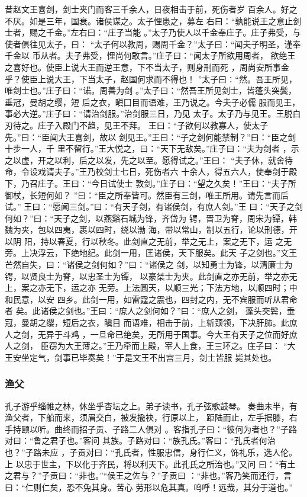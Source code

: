 \documentclass[]{article}
\begin{document}
昔赵文王喜剑，剑士夹门而客三千余人，日夜相击于前，死伤者岁
百余人。好之不厌。如是三年，国衰。诸侯谋之。太子悝患之，募左
右曰：``孰能说王之意止剑士者，赐之千金。''左右曰：``庄子当能
。''太子乃使人以千金奉庄子。庄子弗受，与使者俱往见太子，曰：
``太子何以教周，赐周千金？''太子曰：``闻夫子明圣，谨奉千金以
币从者。夫子弗受，悝尚何敢言。''庄子曰：``闻太子所欲用周者，
欲绝王之喜好也。使臣上说大王而逆王意，下不当太子，则身刑而死
，周尚安所事金乎？使臣上说大王，下当太子，赵国何求而不得也！
''太子曰∶``然。吾王所见，唯剑士也。''庄子曰：``诺。周善为剑
。''太子曰：``然吾王所见剑士，皆蓬头突鬓，垂冠，曼胡之缨，短
后之衣，瞋囗目而语难，王乃说之。今夫子必儒
服而见王，事必大逆。''庄子曰：``请治剑服。''治剑服三日，乃见
太子。太子乃与见王。王脱白刃待之。庄子入殿门不趋，见王不拜。
王曰：``子欲何以教寡人，使太子先。''曰：``臣闻大王喜剑，故以
剑见王。''王曰：``子之剑何能禁制？''曰：``臣之剑十步一人，千
里不留行。''王大悦之，曰：``天下无敌矣。''庄子曰：``夫为剑者
，示之以虚，开之以利，后之以发，先之以至。愿得试之。''王曰：
``夫子休，就舍待命，令设戏请夫子。''王乃校剑士七日，死伤者六
十余人，得五六人，使奉剑于殿下，乃召庄子。王曰：``今日试使士
敦剑。''庄子曰：``望之久矣！''王曰：``夫子所御杖，长短何如？
''曰：``臣之所奉皆可。然臣有三剑，唯王所用。请先言而后试。''
王曰：``愿闻三剑。''曰：``有天子剑，有诸侯剑，有庶人剑。''王
曰：``天子之剑何如？''曰：``天子之剑，以燕谿石城为锋，齐岱为
锷，晋卫为脊，周宋为镡，韩魏为夹，包以四夷，裹以四时，绕以渤
海，带以常山，制以五行，论以刑德，开以阴
阳，持以春夏，行以秋冬。此剑直之无前，举之无上，案之无下，运
之无旁。上决浮云，下绝地纪。此剑一用，匡诸侯，天下服矣。此天
子之剑也。''文王芒然自失，曰：``诸侯之剑何如？''曰：``诸侯之
剑，以知勇士为锋，以清廉士为锷，以贤良士为脊，以忠圣士为镡，
以豪桀士为夹。此剑直之亦无前，举之亦无上，案之亦无下，运之亦
无旁。上法圆天，以顺三光；下法方地，以顺四时；中和民意，以安
四乡。此剑一用，如雷霆之震也，四封之内，无不宾服而听从君命者
矣。此诸侯之剑也。''王曰：``庶人之剑何如？''曰：``庶人之剑，
蓬头突鬓，垂冠，曼胡之缨，短后之衣，瞋目
而语难，相击于前，上斩颈领，下决肝肺。此庶人之剑，无异于斗鸡
，一旦命已绝矣，无所用于国事。今大王有天子之位而好庶人之剑，
臣窃为大王薄之。''王乃牵而上殿，宰人上食，王三环之。庄子曰：
``大王安坐定气，剑事已毕奏矣！''于是文王不出宫三月，剑士皆服 毙其处也。

\hypertarget{header-n988}{%
\subsubsection{渔父}\label{header-n988}}

孔子游乎缁帷之林，休坐乎杏坛之上。弟子读书，孔子弦歌鼓琴。
奏曲未半，有渔父者，下船而来，须眉交白，被发揄袂，行原以上，
距陆而止，左手据膝，右手持颐以听。曲终而招子贡、子路二人俱对
。客指孔子曰：``彼何为者也？''子路对曰：``鲁之君子也。''客问
其族。子路对曰：``族孔氏。''客曰：``孔氏者何治也？''子路未应
，子贡对曰：``孔氏者，性服忠信，身行仁义，饰礼乐，选人伦。上
以忠于世主，下以化于齐民，将以利天下。此孔氏之所治也。''又问
曰：``有土之君与？''子贡曰：``非也。''``侯王之佐与？''子贡曰
：``非也。''客乃笑而还行，言曰：``仁则仁矣，恐不免其身。苦心
劳形以危其真。呜呼！远哉，其分于道也。''
\end{document}
